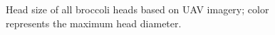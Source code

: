 \begin{figure}[htb]
  \begin{center}
  \end{center}
  \caption[Head size of all broccoli heads based on UAV imagery]{
    Head size of all broccoli heads based on UAV imagery; color represents the maximum head diameter.
  }
  \label{fig:cp4s2}
\end{figure}